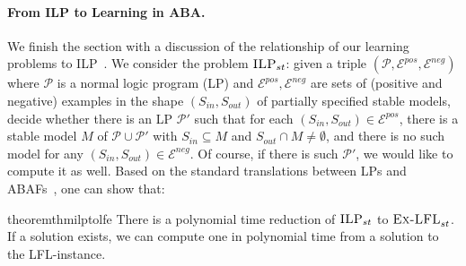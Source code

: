 \documentclass[letterpaper]{article} %
\newcommand{\ilpst}{\ensuremath{\textsc{ILP}_{st}}\xspace}
\newcommand{\ExLFL}[2]{\textsc{Ex-LFL}_{#1}^{#2}}
\newcommand{\Epos}{\mathcal{E}^{pos}}
\newcommand{\Eneg}{\mathcal{E}^{neg}}
\begin{document}
\paragraph{From ILP to Learning in ABA.}
We finish the section with a discussion of the relationship of our learning problems to ILP~\cite{MUGGLETON1994629}.
We consider the problem \ilpst: given a triple $(\mathcal P,\Epos,\Eneg)$ where $\mathcal P$ is a normal logic program (LP) and $\Epos,\Eneg$ are sets of (positive and negative) examples in the shape $(S_{in}, S_{out})$ of partially specified stable models,
decide whether there is an LP $\mathcal P'$ such that for each $(S_{in},S_{out})\in \Epos$, there is a stable model $M$ of $\mathcal P\cup\mathcal P'$ with $S_{in}\subseteq M$ and $S_{out}\cap M\neq \emptyset$, and there is no such model for any $(S_{in},S_{out})\in \Eneg$. Of course, if there is such $\mathcal P'$, we would like to compute it as well. Based on the standard translations between LPs and ABAFs~\cite{BondarenkoDKT97,DBLP:journals/jair/CaminadaS17}, one can show that: 
%
\begin{restatable}{theorem}{thmilptolfe}\label{thm:ilp2lfe}
There is a polynomial time reduction of \ilpst to $\ExLFL{st}{}$. 
If a solution exists, we can compute one in polynomial time from a solution to the LFL-instance.
\end{restatable}
\end{document}
